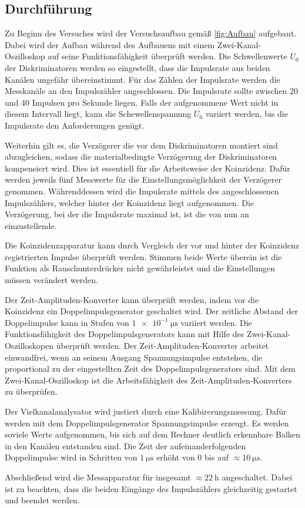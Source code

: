 \subsection{Durchführung}

Zu Beginn des Versuches wird der Versuchsaufbau gemäß \ref{fig:Aufbau} aufgebaut.
Dabei wird der Aufbau während des Aufbauens mit einem Zwei-Kanal-Oszilloskop
auf seine Funktionsfähigkeit überprüft werden.
Die Schwellenwerte $U_0$ der Diskriminatoren werden so eingestellt, dass
die Impulsrate aus beiden Kanälen ungefähr übereinstimmt. Für das Zählen der
Impulsrate werden die Messkanäle an den Impulszähler angeschlossen.
Die Impulsrate sollte zwischen 20 und 40 Impulsen pro Sekunde liegen.
Falls der aufgenommene Wert nicht in diesem Intervall liegt, kann die
Schewellenspannung $U_0$ variiert werden, bis die Impulsrate den Anforderungen genügt.

Weiterhin gilt es, die Verzögerer die vor dem Diskriminatoren montiert sind
abzugleichen, sodass die materialbedingte Verzögerung der Diskriminatoren
kompensiert wird. Dies ist essentiell für die Arbeitsweise der Koinzidenz.
Dafür werden jeweils fünf Messwerte für die Einstellungsmöglichkeit der Verzögerer genommen.
Währenddessen wird die Impulsrate mittels des angeschlossenen Impulszählers, welcher hinter
der Koinzidenz liegt aufgenommen.
Die Verzögerung, bei der die Impulsrate maximal ist, ist die von nun an einzustellende.

Die Koinzidenzapparatur kann durch Vergleich der vor und hinter der Koinzidenz
registrierten Impulse überprüft werden. Stimmen beide Werte überein ist
die Funktion als Rauschunterdrücker nicht gewährleistet und die Einstellungen müssen
verändert werden.

Der Zeit-Amplituden-Konverter kann überprüft werden, indem vor die Koinzidenz ein
Doppelimpulsgenerator geschaltet wird. Der zeitliche Abstand der
Doppelimpulse kann in Stufen von $\SI{1e-1}{\micro\second}$ variiert werden.
Die Funktionsfähigkeit des Doppelimpulsgenerators kann mit Hilfe des
Zwei-Kanal-Oszilloskopen überprüft werden.
Der Zeit-Amplituden-Konverter arbeitet einwandfrei, wenn an seinem
Ausgang Spannungsimpulse entstehen, die proportional zu der
eingestellten Zeit des Doppelimpulsgenerators sind. Mit dem Zwei-Kanal-Oszilloskop
ist die Arbeitsfähigkeit des Zeit-Amplituden-Konverters zu überprüfen.

Der Vielkanalanalysator wird justiert durch eine Kalibirerungsmessung.
Dafür werden mit dem Doppelimpulsgenerator Spannungsimpulse erzeugt.
Es werden soviele Werte aufgenommen, bis sich auf dem Rechner deutlich
erkennbare Balken in den Kanälen entstanden sind.
Die Zeit der aufeinanderfolgenden Doppelimpulse wird in Schritten von $\SI{1}{\micro\second}$
erhöht von 0 bis auf $\approx \SI{10}{\micro\second}$.

Abschließend wird die Messapparatur für insgesamt $\approx \SI{22}{\hour}$
angeschaltet. Dabei ist zu beachten, dass die beiden Eingänge des Impulszählers
gleichzeitig gestartet und beendet werden.
